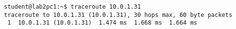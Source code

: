 \begin{lstlisting}
student@lab2pc1:~$ traceroute 10.0.1.31
traceroute to 10.0.1.31 (10.0.1.31), 30 hops max, 60 byte packets
 1  10.0.1.31 (10.0.1.31)  1.474 ms  1.668 ms  1.664 ms
\end{lstlisting}
